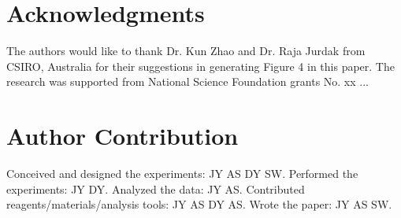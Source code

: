 \documentclass[10pt,letterpaper]{article}
\begin{document}
\section*{Acknowledgments}
The authors would like to thank Dr. Kun Zhao and Dr. Raja Jurdak from CSIRO, Australia for their suggestions in generating Figure 4 in this paper.
The research was supported from National Science Foundation grants No. xx ...

\section*{Author Contribution}
Conceived and designed the experiments: JY AS DY SW. Performed the experiments: JY DY. Analyzed the data: JY AS. Contributed reagents/materials/analysis tools: JY AS DY AS. Wrote the paper: JY AS SW.

\nolinenumbers
\end{document}
